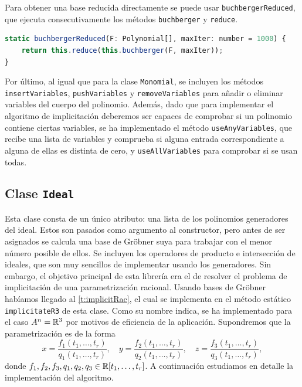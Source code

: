 Para obtener una base reducida directamente se puede usar \texttt{buchbergerReduced}, que ejecuta consecutivamente los métodos \texttt{buchberger} y \texttt{reduce}.
\begin{lstlisting}[language=Javascript]
static buchbergerReduced(F: Polynomial[], maxIter: number = 1000) {
    return this.reduce(this.buchberger(F, maxIter));
}
\end{lstlisting}

Por último, al igual que para la clase \texttt{Monomial}, se incluyen los métodos  \texttt{insertVariables}, \texttt{pushVariables} y \texttt{removeVariables} para añadir o eliminar variables del cuerpo del polinomio. Además, dado que para implementar el algoritmo de implicitación deberemos ser capaces de comprobar si un polinomio contiene ciertas variables, se ha implementado el método \texttt{useAnyVariables}, que recibe una lista de variables y comprueba si alguna entrada correspondiente a alguna de ellas es distinta de cero, y \texttt{useAllVariables} para comprobar si se usan todas.

\subsection{Clase \texttt{Ideal}}
Esta clase consta de un único atributo: una lista de los polinomios generadores del ideal. Estos son pasados como argumento al constructor, pero antes de ser asignados se calcula una base de Gröbner suya para trabajar con el menor número posible de ellos. Se incluyen los operadores de producto e intersección de ideales, que son muy sencillos de implementar usando los generadores. Sin embargo, el objetivo principal de esta librería era el de resolver el problema de implicitación de una parametrización racional. Usando bases de Gröbner habíamos llegado al \autoref{t:implicitRac}, el cual se implementa en el método estático \texttt{implicitateR3} de esta clase. Como su nombre indica, se ha implementado para el caso $A^n = \mathbb{R}^3$ por motivos de eficiencia de la aplicación. Supondremos que la parametrización es de la forma
\begin{equation*}
    x = \frac{f_1(t_1,\dots, t_r)}{q_1(t_1,\dots, t_r)},\quad
    y = \frac{f_2(t_1,\dots, t_r)}{q_2(t_1,\dots, t_r)},\quad
    z = \frac{f_3(t_1,\dots, t_r)}{q_3(t_1,\dots, t_r)},
\end{equation*}
donde $f_1,f_2,f_3,q_1,q_2,q_3 \in \mathbb{R}[t_1,\dots, t_r]$. A continuación estudiamos en detalle la implementación del algoritmo.\newline


